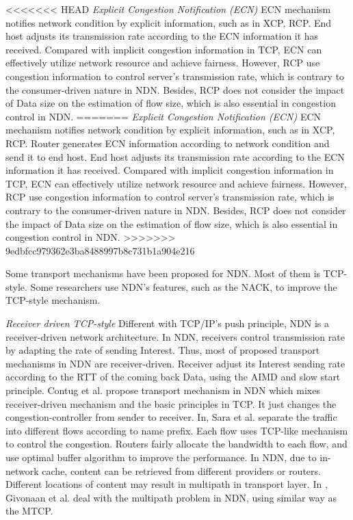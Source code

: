 <<<<<<< HEAD
\emph{Explicit Congestion Notification (ECN)} ECN mechanism notifies network condition by explicit information, such as in XCP\cite{XCP}, RCP\cite{RCP}. End host adjusts its transmission rate according to the ECN information it has received. Compared with implicit congestion information in TCP, ECN can effectively utilize network resource and achieve fairness. However, RCP use congestion information to control server's transmission rate, which is contrary to the consumer-driven nature in NDN. Besides, RCP does not consider the impact of Data size on the estimation of flow size, which is also essential in congestion control in NDN.
=======
\emph{Explicit Congestion Notification (ECN)} ECN mechanism notifies network condition by explicit information, such as in XCP\cite{XCP}, RCP\cite{RCP}. Router generates ECN information according to network condition and send it to end host. End host adjusts its transmission rate according to the ECN information it has received. Compared with implicit congestion information in TCP, ECN can effectively utilize network resource and achieve fairness. However, RCP use congestion information to control server's transmission rate, which is contrary to the consumer-driven nature in NDN. Besides, RCP does not consider the impact of Data size on the estimation of flow size, which is also essential in congestion control in NDN. 
>>>>>>> 9edbfcc979362e3ba8488997b8c731b1a904e216


Some transport mechanisms have been proposed for NDN. Most of them is TCP-style. Some researchers use NDN's features, such as the NACK, to improve the TCP-style mechanism.

\emph{Receiver driven TCP-style} Different with TCP/IP's push principle, NDN is a receiver-driven network architecture. In NDN, receivers control transmission rate by adapting the rate of sending Interest. Thus, most of proposed transport mechanisms in NDN are receiver-driven. Receiver adjust its Interest sending rate according to the RTT of the coming back Data, using the AIMD and slow start principle. Contug et al.\cite{Contug} propose transport mechanism in NDN which mixes receiver-driven mechanism and the basic principles in TCP. It just changes the congestion-controller from sender to receiver. In\cite{Flow}, Sara et al. separate the traffic into different flows according to name prefix. Each flow uses TCP-like mechanism to control the congestion. Routers fairly allocate the bandwidth to each flow, and use optimal buffer algorithm to improve the performance. In NDN, due to in-network cache, content can be retrieved from different providers or routers. Different locations of content may result in multipath in transport layer. In \cite{Multipath}, Givonaan et al. deal with the multipath problem in NDN, using similar way as the MTCP.


